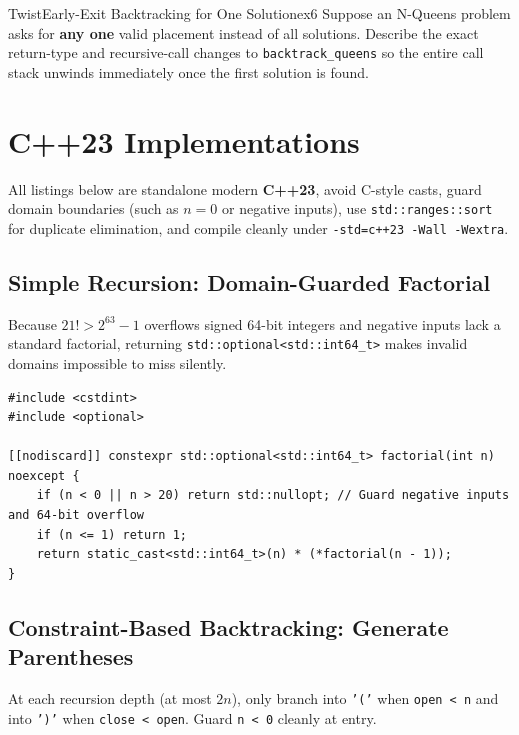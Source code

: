 \documentclass[11pt,a4paper]{article}
\theoremstyle{definition}
\begin{document}
\begin{tryitbox}{Twist}{Early-Exit Backtracking for One Solution}{ex6}
Suppose an N-Queens problem asks for \textbf{any one} valid placement instead of all solutions. Describe the exact return-type and recursive-call changes to \texttt{backtrack\_queens} so the entire call stack unwinds immediately once the first solution is found.
\end{tryitbox}

\section{C++23 Implementations}

All listings below are standalone modern \textbf{C++23}, avoid C-style casts, guard domain boundaries (such as $n = 0$ or negative inputs), use \texttt{std::ranges::sort} for duplicate elimination, and compile cleanly under \texttt{-std=c++23 -Wall -Wextra}.

\subsection{Simple Recursion: Domain-Guarded Factorial}

Because $21! > 2^{63} - 1$ overflows signed 64-bit integers and negative inputs lack a standard factorial, returning \texttt{std::optional<std::int64\_t>} makes invalid domains impossible to miss silently.

\begin{lstlisting}[caption={Domain-Guarded Recursive Factorial in C++23}]
#include <cstdint>
#include <optional>

[[nodiscard]] constexpr std::optional<std::int64_t> factorial(int n) noexcept {
    if (n < 0 || n > 20) return std::nullopt; // Guard negative inputs and 64-bit overflow
    if (n <= 1) return 1;
    return static_cast<std::int64_t>(n) * (*factorial(n - 1));
}
\end{lstlisting}

\subsection{Constraint-Based Backtracking: Generate Parentheses}

At each recursion depth (at most $2n$), only branch into \texttt{'('} when \texttt{open < n} and into \texttt{')'} when \texttt{close < open}. Guard \texttt{n < 0} cleanly at entry.
\end{document}
